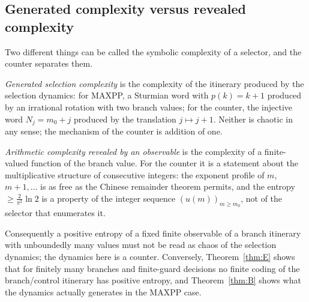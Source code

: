 \subsection{Generated complexity versus revealed complexity}
Two different things can be called the symbolic complexity of a selector, and the counter separates them.

\emph{Generated selection complexity} is the complexity of the itinerary produced by the selection dynamics: for \textsf{MAXPP}, a Sturmian word with $p(k)=k+1$ produced by an irrational rotation with two branch values; for the counter, the injective word $N_j=m_0+j$ produced by the translation $j\mapsto j+1$. Neither is chaotic in any sense; the mechanism of the counter is addition of one.

\emph{Arithmetic complexity revealed by an observable} is the complexity of a finite-valued function of the branch value. For the counter it is a statement about the multiplicative structure of consecutive integers: the exponent profile of $m$, $m+1,\dots$ is as free as the Chinese remainder theorem permits, and the entropy $\ge\frac{2}{\pi^2}\ln 2$ is a property of the integer sequence $(u(m))_{m\ge m_0}$, not of the selector that enumerates it.

Consequently a positive entropy of a fixed finite observable of a branch itinerary with unboundedly many values must not be read as chaos of the selection dynamics; the dynamics here is a counter. Conversely, Theorem~\ref{thm:E} shows that for finitely many branches and finite-guard decisions no finite coding of the branch/control itinerary has positive entropy, and Theorem~\ref{thm:B} shows what the dynamics actually generates in the \textsf{MAXPP} case.

